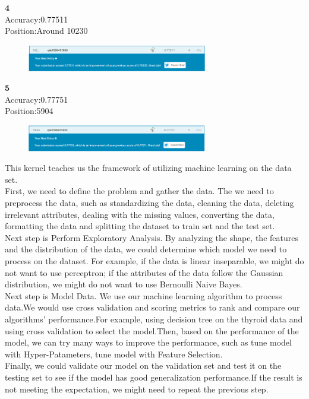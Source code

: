 \documentclass[12pt]{article}
\begin{document}
$\textbf{4}$\\

Accuracy:0.77511\\

Position:Around 10230

\begin{figure}[H] 
\centering 
\includegraphics[width=0.7\textwidth]{sc4} 
\end{figure}

$\textbf{5}$\\

Accuracy:0.77751\\

Position:5904

\begin{figure}[H] 
\centering 
\includegraphics[width=0.7\textwidth]{sc5} 
\end{figure}

\newpage
This kernel teaches us the framework of utilizing machine learning on the data set.\\

First, we need to define the problem and gather the data. The we need to preprocess the data, such as standardizing the data, cleaning the data, deleting irrelevant attributes, dealing with the missing values, converting the data, formatting the data and splitting the dataset to train set and the test set.\\

Next step is Perform Exploratory Analysis. By analyzing the shape, the features and the distribution of the data, we could determine which model we need to process on the dataset. For example, if the data is linear inseparable, we might do not want to use perceptron; if the attributes of the data follow the Gaussian distribution, we might do not want to use Bernoulli Naive Bayes.\\

Next step is Model Data. We use our machine learning algorithm to process data.We would use cross validation and scoring metrics to rank and compare our algorithms’ performance.For example, using decision tree on the thyroid data and using cross validation to select the model.Then, based on the performance of the model, we can try many ways to improve the performance, such as tune model with Hyper-Patameters,  tune model with Feature Selection.\\

Finally, we could validate our model on the validation set and test it on the testing set to see if the model has good generalization performance.If the result is not meeting the expectation, we might need to repeat the previous step.\\ 
\end{document}
